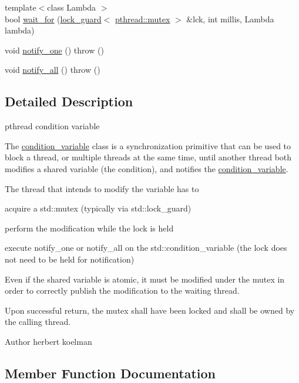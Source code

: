 \begin{DoxyCompactItemize}
\item 
{\footnotesize template$<$class Lambda $>$ }\\bool \hyperlink{classpthread_1_1condition__variable_a5ee32edbf76592ec443e2544ecba811a}{wait\+\_\+for} (\hyperlink{classpthread_1_1lock__guard}{lock\+\_\+guard}$<$ \hyperlink{classpthread_1_1mutex}{pthread\+::mutex} $>$ \&lck, int millis, Lambda lambda)
\item 
void \hyperlink{classpthread_1_1condition__variable_a71a7f70ef29da791b1525d1ab8af01ea}{notify\+\_\+one} ()  throw ()
\item 
void \hyperlink{classpthread_1_1condition__variable_a8aed3a66334aec0e3a82090ac4d05483}{notify\+\_\+all} ()  throw ()
\end{DoxyCompactItemize}


\subsection{Detailed Description}
pthread condition variable

The \hyperlink{classpthread_1_1condition__variable}{condition\+\_\+variable} class is a synchronization primitive that can be used to block a thread, or multiple threads at the same time, until another thread both modifies a shared variable (the condition), and notifies the \hyperlink{classpthread_1_1condition__variable}{condition\+\_\+variable}.

The thread that intends to modify the variable has to
\begin{DoxyItemize}
\item acquire a std\+::mutex (typically via std\+::lock\+\_\+guard)
\item perform the modification while the lock is held
\item execute notify\+\_\+one or notify\+\_\+all on the std\+::condition\+\_\+variable (the lock does not need to be held for notification)
\end{DoxyItemize}

Even if the shared variable is atomic, it must be modified under the mutex in order to correctly publish the modification to the waiting thread.

Upon successful return, the mutex shall have been locked and shall be owned by the calling thread.

\begin{DoxyAuthor}{Author}
herbert koelman 
\end{DoxyAuthor}


\subsection{Member Function Documentation}
